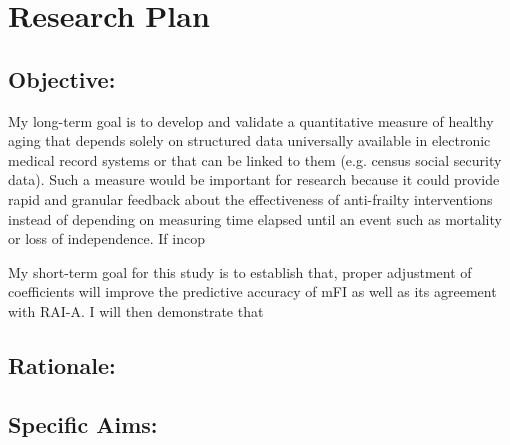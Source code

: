 \section{Research Plan }\label{research-plan}


\subsection{Objective:}\label{objective}
  
My long-term goal is to develop and validate a quantitative measure of healthy aging that depends solely on structured data universally available in electronic medical record systems or that can be linked to them (e.g. census social security data). Such a measure would be important for research because it could provide rapid and granular feedback about the effectiveness of anti-frailty interventions instead of depending on measuring time elapsed until an event such as mortality or loss of independence. If incop 

My short-term goal for this study is to establish that, proper adjustment of coefficients will improve the predictive accuracy of mFI as well as its agreement with RAI-A. I will then demonstrate that 

\subsection{Rationale:}\label{rationale}

\subsection{Specific Aims:}\label{specific-aims}
